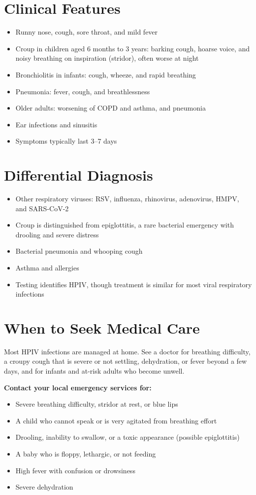 \section*{Clinical Features}
\begin{itemize}
    \item Runny nose, cough, sore throat, and mild fever
    \item Croup in children aged 6 months to 3 years: barking cough, hoarse voice, and noisy breathing on inspiration (stridor), often worse at night
    \item Bronchiolitis in infants: cough, wheeze, and rapid breathing
    \item Pneumonia: fever, cough, and breathlessness
    \item Older adults: worsening of COPD and asthma, and pneumonia
    \item Ear infections and sinusitis
    \item Symptoms typically last 3--7 days
\end{itemize}

\section*{Differential Diagnosis}
\begin{itemize}
    \item Other respiratory viruses: RSV, influenza, rhinovirus, adenovirus, HMPV, and SARS-CoV-2
    \item Croup is distinguished from epiglottitis, a rare bacterial emergency with drooling and severe distress
    \item Bacterial pneumonia and whooping cough
    \item Asthma and allergies
    \item Testing identifies HPIV, though treatment is similar for most viral respiratory infections
\end{itemize}

\section*{When to Seek Medical Care}
Most HPIV infections are managed at home. See a doctor for breathing difficulty, a croupy cough that is severe or not settling, dehydration, or fever beyond a few days, and for infants and at-risk adults who become unwell.

\textbf{Contact your local emergency services for:}
\begin{itemize}
    \item Severe breathing difficulty, stridor at rest, or blue lips
    \item A child who cannot speak or is very agitated from breathing effort
    \item Drooling, inability to swallow, or a toxic appearance (possible epiglottitis)
    \item A baby who is floppy, lethargic, or not feeding
    \item High fever with confusion or drowsiness
    \item Severe dehydration
\end{itemize}

